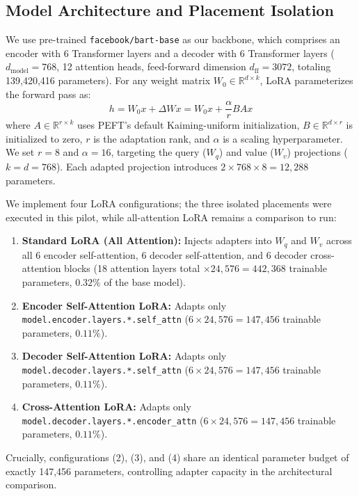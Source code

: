\documentclass[11pt, letterpaper]{article}
\begin{document}
\subsection{Model Architecture and Placement Isolation}
We use pre-trained \texttt{facebook/bart-base} as our backbone, which comprises an encoder with 6 Transformer layers and a decoder with 6 Transformer layers ($d_{\text{model}} = 768$, 12 attention heads, feed-forward dimension $d_{\text{ff}} = 3072$, totaling 139,420,416 parameters). For any weight matrix $W_0 \in \mathbb{R}^{d \times k}$, LoRA parameterizes the forward pass as:
\begin{equation}
h = W_0 x + \Delta W x = W_0 x + \frac{\alpha}{r} B A x
\end{equation}
where $A \in \mathbb{R}^{r \times k}$ uses PEFT's default Kaiming-uniform initialization, $B \in \mathbb{R}^{d \times r}$ is initialized to zero, $r$ is the adaptation rank, and $\alpha$ is a scaling hyperparameter. We set $r = 8$ and $\alpha = 16$, targeting the query ($W_q$) and value ($W_v$) projections ($k = d = 768$). Each adapted projection introduces $2 \times 768 \times 8 = 12,288$ parameters.

We implement four LoRA configurations; the three isolated placements were executed in this pilot, while all-attention LoRA remains a comparison to run:
\begin{enumerate}[leftmargin=*,itemsep=1pt]
  \item \textbf{Standard LoRA (All Attention):} Injects adapters into $W_q$ and $W_v$ across all 6 encoder self-attention, 6 decoder self-attention, and 6 decoder cross-attention blocks (18 attention layers total $\times 24,576 = 442,368$ trainable parameters, $0.32\%$ of the base model).
  \item \textbf{Encoder Self-Attention LoRA:} Adapts only \texttt{model.encoder.layers.*.self\_attn} ($6 \times 24,576 = 147,456$ trainable parameters, $0.11\%$).
  \item \textbf{Decoder Self-Attention LoRA:} Adapts only \texttt{model.decoder.layers.*.self\_attn} ($6 \times 24,576 = 147,456$ trainable parameters, $0.11\%$).
  \item \textbf{Cross-Attention LoRA:} Adapts only \texttt{model.decoder.layers.*.encoder\_attn} ($6 \times 24,576 = 147,456$ trainable parameters, $0.11\%$).
\end{enumerate}
Crucially, configurations (2), (3), and (4) share an identical parameter budget of exactly 147,456 parameters, controlling adapter capacity in the architectural comparison.
\end{document}
